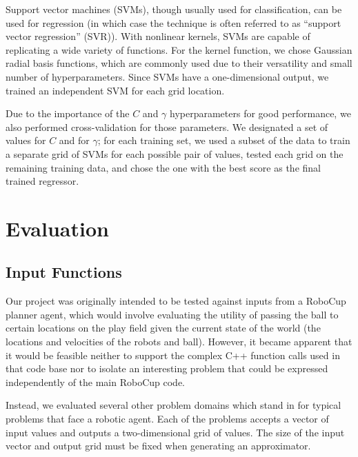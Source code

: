 \documentclass{article}
\begin{document}
Support vector machines (SVMs), though usually used for classification, can be used for regression (in which case the technique is often referred to as ``support vector regression'' (SVR)). With nonlinear kernels, SVMs are capable of replicating a wide variety of functions. For the kernel function, we chose Gaussian radial basis functions, which are commonly used due to their versatility and small number of hyperparameters. Since SVMs have a one-dimensional output, we trained an independent SVM for each grid location.

Due to the importance of the $C$ and $\gamma$ hyperparameters for good performance, we also performed cross-validation for those parameters. We designated a set of values for $C$ and for $\gamma$; for each training set, we used a subset of the data to train a separate grid of SVMs for each possible pair of values, tested each grid on the remaining training data, and chose the one with the best score as the final trained regressor.

\section{Evaluation}

\subsection{Input Functions}

Our project was originally intended to be tested against inputs from a RoboCup planner agent, which would involve evaluating the utility of passing the ball to certain locations on the play field given the current state of the world (the locations and velocities of the robots and ball). However, it became apparent that it would be feasible neither to support the complex C++ function calls used in that code base nor to isolate an interesting problem that could be expressed independently of the main RoboCup code.

Instead, we evaluated several other problem domains which stand in for typical problems that face a robotic agent. Each of the problems accepts a vector of input values and outputs a two-dimensional grid of values. The size of the input vector and output grid must be fixed when generating an approximator.
\end{document}
